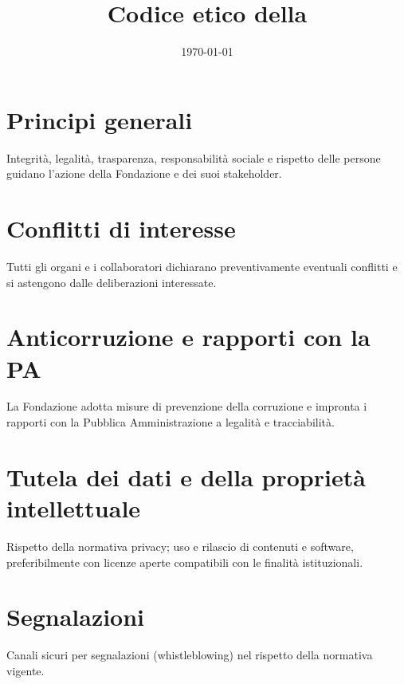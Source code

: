 \documentclass[11pt,a4paper]{article}
\title{Codice etico della \FondazioneNome}
\author{}
\date{\today}
\begin{document}
\maketitle

\begin{center}
\end{center}

\section*{Principi generali}
Integrità, legalità, trasparenza, responsabilità sociale e rispetto delle persone guidano l'azione della Fondazione e dei suoi stakeholder.

\section*{Conflitti di interesse}
Tutti gli organi e i collaboratori dichiarano preventivamente eventuali conflitti e si astengono dalle deliberazioni interessate.

\section*{Anticorruzione e rapporti con la PA}
La Fondazione adotta misure di prevenzione della corruzione e impronta i rapporti con la Pubblica Amministrazione a legalità e tracciabilità.

\section*{Tutela dei dati e della proprietà intellettuale}
Rispetto della normativa privacy; uso e rilascio di contenuti e software, preferibilmente con licenze aperte compatibili con le finalità istituzionali.

\section*{Segnalazioni}
Canali sicuri per segnalazioni (whistleblowing) nel rispetto della normativa vigente.
\end{document}
